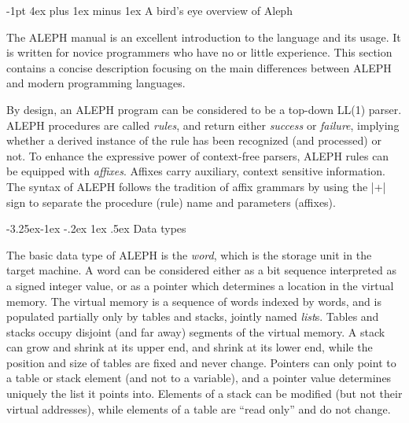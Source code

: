 \documentclass[titlepage]{article}
\makeatletter
\newcommand\A{\textsf{ALEPH}}
\newcommand\g[1]{\textsf{#1}}
\renewcommand\subsection{%
\@startsection{subsection}{2}{\z@}%
   {-3.25ex\@plus -1ex \@minus -.2ex}%
   {1ex \@plus .5ex}%
   {\normalfont\normalsize\bfseries}}
\renewcommand\section{%
\newpage
\@startsection{section}{1}{\z@}%
   {-1pt}%
   {4ex plus 1ex minus 1ex}%
   {\normalfont\Large\bfseries}}
\let\osection\section
\def\section {\newpage\osection}
\makeatother
\begin{document}
\tableofcontents
\newpage

\section{A bird's eye overview of Aleph}\label{section:overview}

The \A{} manual \cite{A-manual} is an excellent introduction to the language
and its usage. It is written for novice programmers who have no or little
experience. This section contains a concise description focusing on the main
differences between \A{} and modern programming languages.

By design, an \A{} program can be considered to be a top-down \g{LL(1)}
parser\cite{aho-ullman}. \A{} procedures are called \emph{rules}, and return
either \emph{success} or \emph{failure}, implying whether a derived instance
of the rule has been recognized (and processed) or not. To enhance the
expressive power of context-free parsers, \A{} rules can be equipped with
\emph{affixes}. Affixes carry auxiliary, context sensitive information. The
syntax of \A{} follows the tradition of affix grammars \cite{wijn} by using
the \pp|+| sign to separate the procedure (rule) name and parameters
(affixes).


\subsection{Data types}

The basic data type of \A{} is the \emph{word}, which is the storage unit in
the target machine. A word can be considered either as a bit sequence
interpreted as a signed integer value, or as a pointer which determines a
location in the virtual memory. The virtual memory is a sequence of words
indexed by words, and is populated partially only by \g{table}s and
\g{stack}s, jointly named \emph{list}s. Tables and stacks occupy disjoint
(and far away) segments of the virtual memory. A stack can grow and shrink
at its upper end, and shrink at its lower end, while the position and size
of tables are fixed and never change. Pointers can only point to a table or
stack element (and not to a variable), and a pointer value determines
uniquely the list it points into. Elements of a \g{stack} can be modified
(but not their virtual addresses), while elements of a \g{table} are ``read
only'' and do not change.
\end{document}

